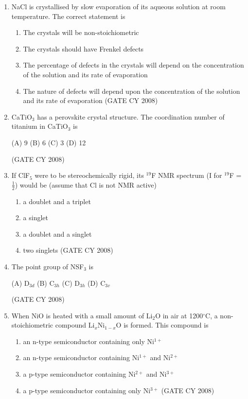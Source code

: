 \documentclass[12pt]{article}
\begin{document}
\begin{enumerate}
\item NaCl is crystallised by slow evaporation of its aqueous solution at room temperature. The correct statement is
\begin{enumerate}
\item  The crystals will be non-stoichiometric
\item  The crystals should have Frenkel defects
\item  The percentage of defects in the crystals will depend on the concentration of the solution and its rate of evaporation
\item  The nature of defects will depend upon the concentration of the solution and its rate of evaporation    \hfill{(GATE CY 2008)}
\end{enumerate}


\item CaTiO$_3$ has a perovskite crystal structure. The coordination number of titanium in CaTiO$_3$ is
\begin{multicols}{2}
(A) 9 
(B) 6 
(C) 3 
(D) 12   
\end{multicols}
 \hfill{(GATE CY 2008)}




\item If ClF$_5$ were to be stereochemically rigid, its $^{19}$F NMR spectrum (I for $^{19}$F = $\frac{1}{2}$) would be (assume that Cl is not NMR active)
\begin{enumerate}
\item a doublet and a triplet
\item a singlet
\item  a doublet and a singlet
\item two singlets    \hfill{(GATE CY 2008)}
\end{enumerate}


\item The point group of NSF$_3$ is
\begin{multicols}{4}
 (A) D$_{3d}$ 
(B) C$_{3h}$ 
(C) D$_{3h}$ 
(D) C$_{3v}$   
\end{multicols}
    \hfill{(GATE CY 2008)}


\item When NiO is heated with a small amount of Li$_2$O in air at 1200$^\circ$C, a non-stoichiometric compound Li$_x$Ni$_{1-x}$O is formed. This compound is
\begin{enumerate}
\item  an n-type semiconductor containing only Ni$^{1+}$
\item an n-type semiconductor containing Ni$^{1+}$ and Ni$^{2+}$
\item a p-type semiconductor containing Ni$^{2+}$ and Ni$^{3+}$
\item a p-type semiconductor containing only Ni$^{3+}$    \hfill{(GATE CY 2008)}
\end{enumerate}
\degree





\end{enumerate}
\end{document}
